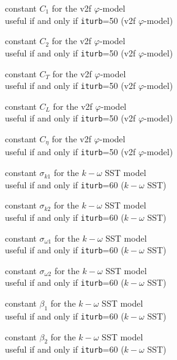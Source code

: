 {constant $C_1$ for the v2f $\varphi$-model\\
useful if and only if {\tt iturb}=50
(v2f $\varphi$-model)}

{constant $C_2$ for the v2f $\varphi$-model\\
useful if and only if {\tt iturb}=50
(v2f $\varphi$-model)}

{constant $C_T$ for the v2f $\varphi$-model\\
useful if and only if {\tt iturb}=50
(v2f $\varphi$-model)}

{constant $C_L$ for the v2f $\varphi$-model\\
useful if and only if {\tt iturb}=50
(v2f $\varphi$-model)}

{constant $C_\eta$ for the v2f $\varphi$-model\\
useful if and only if {\tt iturb}=50
(v2f $\varphi$-model)}


{constant $\sigma_{k1}$ for the $k-\omega$ SST model\\
useful if and only if {\tt iturb}=60
($k-\omega$ SST)}

{constant $\sigma_{k2}$ for the $k-\omega$ SST model\\
useful if and only if {\tt iturb}=60
($k-\omega$ SST)}

{constant $\sigma_{\omega 1}$ for the $k-\omega$ SST model\\
useful if and only if {\tt iturb}=60
($k-\omega$ SST)}

{constant $\sigma_{\omega 2}$ for the $k-\omega$ SST model\\
useful if and only if {\tt iturb}=60
($k-\omega$ SST)}

{constant $\beta_1$ for the $k-\omega$ SST model\\
useful if and only if {\tt iturb}=60
($k-\omega$ SST)}

{constant $\beta_2$ for the $k-\omega$ SST model\\
useful if and only if {\tt iturb}=60
($k-\omega$ SST)}

